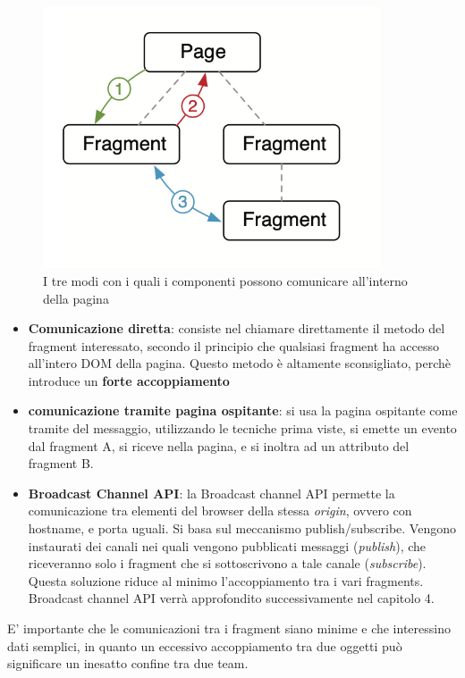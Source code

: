 \begin{figure}[H]
    \centering
    \includegraphics[width=100mm]{img/comunicazione}
    \caption{I tre modi con i quali i componenti possono comunicare all'interno della pagina}
  \end{figure}

\begin{itemize}
    \item \textbf{Comunicazione diretta}: consiste nel chiamare direttamente il metodo del fragment
    interessato, secondo il principio che qualsiasi fragment ha accesso all'intero DOM della pagina.
    Questo metodo è altamente sconsigliato, perchè introduce un \textbf{forte accoppiamento}
    \item \textbf{comunicazione tramite pagina ospitante}: si usa la pagina ospitante come tramite del messaggio,
    utilizzando le tecniche prima viste, si emette un evento dal fragment A, si riceve nella pagina, e si inoltra ad un attributo 
    del fragment B.
    \item \textbf{Broadcast Channel API}: la Broadcast channel API permette la comunicazione 
    tra elementi del browser della stessa \emph{origin}, ovvero con hostname, e porta uguali. 
    Si basa sul meccanismo publish/subscribe.
    Vengono instaurati dei canali nei quali vengono pubblicati messaggi (\emph{publish}), 
    che riceveranno solo i fragment che si sottoscrivono a tale canale (\emph{subscribe}).
    Questa soluzione riduce al minimo l'accoppiamento tra i vari fragments.
    Broadcast channel API verrà approfondito successivamente nel capitolo 4.
\end{itemize}

E' importante che le comunicazioni tra i fragment siano minime e che interessino dati semplici, in quanto
un eccessivo accoppiamento tra due oggetti può significare un inesatto confine tra due team.




